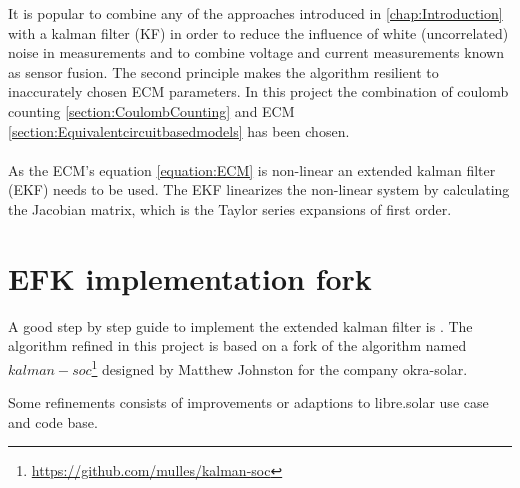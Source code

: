 It is popular to combine %
any of the approaches introduced in \ref{chap:Introduction} with a kalman filter (KF) in order to reduce the influence of white (uncorrelated) noise in measurements and to combine voltage and current measurements known as sensor fusion. The second principle makes the algorithm resilient %
to inaccurately chosen ECM parameters. In this project the combination of coulomb counting \ref{section:CoulombCounting} and ECM \ref{section:Equivalentcircuitbasedmodels} has been chosen. \\ %
\\
As the  ECM's equation \ref{equation:ECM}  is non-linear an extended kalman filter (EKF) needs to be used. The EKF linearizes the non-linear system by calculating the Jacobian matrix, which is the Taylor series expansions of first order.  %
\\

\section{EFK implementation fork}
\label{Fork}

A good step by step guide to implement the extended kalman filter is \cite{rzepka2021implementing}. The algorithm refined in this project is based on a fork of the algorithm named $kalman-soc$\footnote{ \url{https://github.com/mulles/kalman-soc}} designed by Matthew Johnston for the company okra-solar. 

Some refinements consists of improvements or adaptions to libre.solar use case and code base.
 \\




